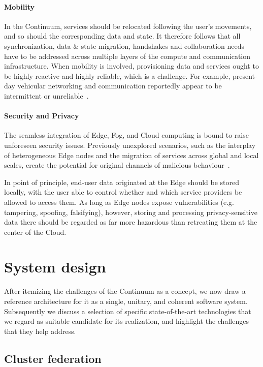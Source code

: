 \paragraph{Mobility}

In the Continuum, services should be relocated following the user's movements, and so should the corresponding data and state. 
It therefore follows that all synchronization, data \& state migration, handshakes and collaboration needs have to be addressed across multiple layers of the compute and communication infrastructure.
When mobility is involved, provisioning data and services ought to be highly reactive and highly reliable, which is a challenge. 
For example, present-day vehicular networking and communication reportedly appear to be intermittent or unreliable~\cite{he2014developing}.

\paragraph{Security and Privacy}

The seamless integration of Edge, Fog, and Cloud computing is bound to raise unforeseen security issues. Previously unexplored scenarios, such as the interplay of heterogeneous Edge nodes and the migration of services across global and local scales, create the potential for original channels of malicious behaviour~\cite{yu2017survey}.

In point of principle, end-user data originated at the Edge should be stored locally, with the user able to control whether and which service providers be allowed to access them. 
As long as Edge nodes expose vulnerabilities (e.g. tampering, spoofing, falsifying), however, storing and processing privacy-sensitive data there should be regarded as far more hazardous than retreating them at the center of the Cloud.

\section{System design}
\label{sec:technicals}

After itemizing the challenges of the Continuum as a concept, we now draw a reference architecture for it as a single, unitary, and coherent software system.
Subsequently we discuss a selection of specific state-of-the-art technologies that we regard as suitable candidate for its realization, and highlight the challenges that they help address. 

\subsection{Cluster federation}

